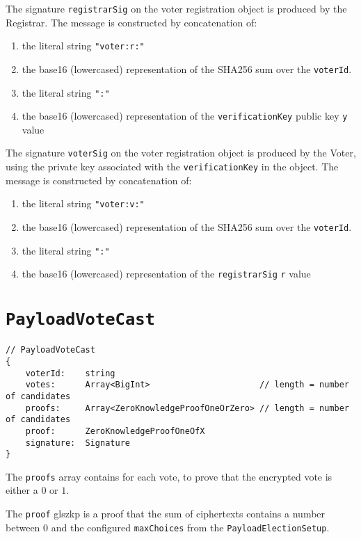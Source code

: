 The signature \texttt{registrarSig} on the voter registration object is produced by the Registrar. The message is constructed by concatenation of:

\begin{enumerate}
    \item the literal string \lstinline[style=ES6]{"voter:r:"}
    \item the base16 (lowercased) representation of the SHA256 sum over the \texttt{voterId}.
    \item the literal string \lstinline[style=ES6]{":"}
    \item the base16 (lowercased) representation of the \texttt{verificationKey} public key \texttt{y} value
\end{enumerate}

The signature \texttt{voterSig} on the voter registration object is produced by the Voter, using the private key associated with the \texttt{verificationKey} in the object. The message is constructed by concatenation of:

\begin{enumerate}
    \item the literal string \lstinline[style=ES6]{"voter:v:"}
    \item the base16 (lowercased) representation of the SHA256 sum over the \texttt{voterId}.
    \item the literal string \lstinline[style=ES6]{":"}
    \item the base16 (lowercased) representation of the \texttt{registrarSig} \texttt{r} value
\end{enumerate}

\section*{\texttt{PayloadVoteCast}}
\label{dt:payload:cast}
\begin{lstlisting}[style=ES6]
// PayloadVoteCast
{
    voterId:    string
    votes:      Array<BigInt>                      // length = number of candidates
    proofs:     Array<ZeroKnowledgeProofOneOrZero> // length = number of candidates
    proof:      ZeroKnowledgeProofOneOfX
    signature:  Signature
}
\end{lstlisting}

The \texttt{proofs} array contains  for each vote, to prove that the encrypted vote is either a $0$ or $1$.

The \texttt{proof} gls{zkp} is a proof that the sum of ciphertexts contains a number between $0$ and the configured \texttt{maxChoices} from the \texttt{PayloadElectionSetup}.

